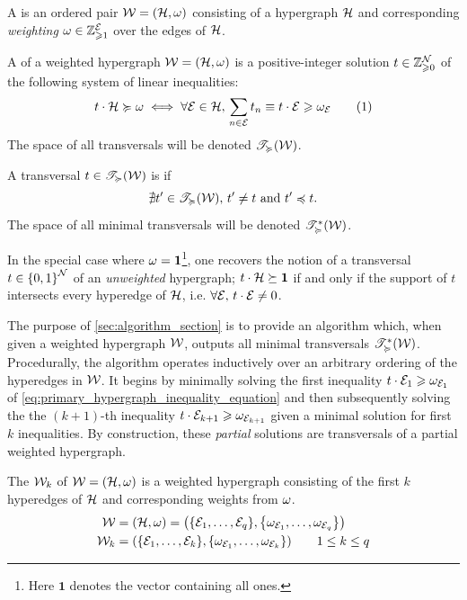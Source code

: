 \documentclass[aps, 10pt, english, twoside, twocolumn, pra, nofootinbib, tightenlines, longbibliography, superscriptaddress]{revtex4-1}
\begin{document}
    \begin{definition}
        A  is an ordered pair $\s W = \br{\s H, \w}$ consisting of a hypergraph $\mathcal{H}$ and corresponding \textit{weighting} $\omega \in {\mathbb{Z}}_{\geqslant 1}^{\mathcal{E}}$ over the edges of $\mathcal{H}$.
    \end{definition}

    \begin{definition}
        A  of a weighted hypergraph $\s W = \br{\s H, \w}$ is a positive-integer solution $t \in {\mathbb{Z}}_{\geqslant0}^{\mathcal{N}}$ of the following system of linear inequalities:
        \[ t \cdot \s H \succcurlyeq \w \iff \forall \s E \in \s H, \, \sum_{n \in \s E}t_{n} \defined t \cdot \s E \geqslant \w_{\s E} \eq \label{eq:primary_hypergraph_inequality_equation} \]
        The space of all transversals will be denoted $\mathscr{T}_{\succcurlyeq}\br{\s W}$.
    \end{definition}

    \begin{definition}
        A transversal $t \in \mathscr{T}_{\succcurlyeq}\br{\s W}$ is  if
        \[ \nexists t' \in \mathscr{T}_{\succcurlyeq}\br{\s W}, \, t'\neq t \text{ and } t' \preccurlyeq t. \]
        The space of all minimal transversals will be denoted $\mathscr{T}^{*}_{\succcurlyeq}\br{\s W}$.
    \end{definition}

    In the special case where $\omega = \mathbf{1}$\footnote{Here $\mathbf{1}$ denotes the vector containing all ones.}, one recovers the notion of a transversal $t \in \bc{0,1}^{\nodes}$ of an \textit{unweighted} hypergraph; $t \cdot \mathcal{H} \succeq \mathbf{1}$ if and only if the support of $t$ intersects every hyperedge of $\mathcal{H}$, i.e. $\forall \mathcal{E}, \, t \cdot \mathcal{E} \neq 0$.

    The purpose of \cref{sec:algorithm_section} is to provide an algorithm which, when given a weighted hypergraph $\mathcal{W}$, outputs all minimal transversals $\mathscr{T}^{*}_{\succcurlyeq}\br{\s W}$. Procedurally, the algorithm operates inductively over an arbitrary ordering of the hyperedges in $\mathcal{W}$. It begins by minimally solving the first inequality $t \cdot \mathcal{E}_1 \geqslant \omega_{\mathcal{E}_1}$ of \cref{eq:primary_hypergraph_inequality_equation} and then subsequently solving the the $(k+1)$-th inequality $t \cdot \mathcal{E}_{k+1} \geqslant \omega_{\mathcal{E}_{k+1}}$ given a minimal solution for first $k$ inequalities. By construction, these \textit{partial} solutions are transversals of a partial weighted hypergraph.
    \begin{definition}
        The  $\mathcal{W}_{k}$ of $\s W = \br{\s H, \w}$ is a weighted hypergraph consisting of the first $k$ hyperedges of $\mathcal{H}$ and corresponding weights from $\omega$.
        \begin{align*}
            \s W &= \br{\s H, \w} = \br{\bc{\s E_1, \ldots, \s E_q}, \bc{\w_{\s E_1}, \ldots, \w_{\s E_q}}} \\
            \s W_{k} &= \br{\bc{\s E_1, \ldots, \s E_k}, \bc{\w_{\s E_1}, \ldots, \w_{\s E_k}}} \qquad 1 \leq k \leq q
        \end{align*}
    \end{definition}
\end{document}
